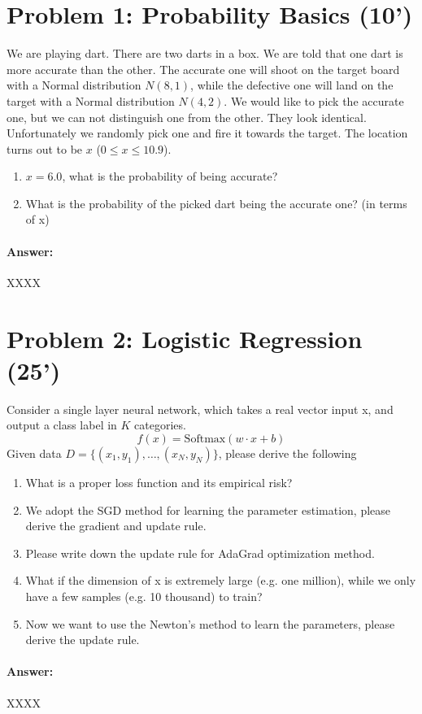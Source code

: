 \documentclass[12pt,letterpaper]{article}
\begin{document}
\section*{Problem 1: Probability Basics (10')} 

We are playing dart. There are two darts in a box. We are told that one dart is more accurate than the other. 
The accurate one will shoot on the target board with a Normal distribution $N(8, 1)$, while the defective one will land on the target with a Normal distribution $N(4, 2)$.
We would like to pick the accurate one, but we can not distinguish one from the other. They look identical. 
Unfortunately we randomly pick one and fire it towards the target. The location turns out to be $x$ ($0 \leq x \leq 10.9$).


\begin{enumerate}
  \item $x=6.0$, what is the probability of being accurate?

  \item What is the probability of the picked dart being the accurate one? (in terms of x)

\end{enumerate}


\paragraph{Answer:}

XXXX


\section*{Problem 2: Logistic Regression (25')} 
Consider a single layer neural network, which takes a real vector input x, and output a class label in $K$ categories. 
\[f(x) = \mathrm{Softmax}(w\cdot x + b)
    \]
Given data $D=\{(x_1,y_1), \dots, (x_N, y_N)\}$, please derive the following
\begin{enumerate}
    \item What is a proper loss function and its empirical risk?
    \item We adopt the SGD method for learning the parameter estimation, please derive the gradient and update rule.
    \item Please write down the update rule for AdaGrad optimization method.
    \item What if the dimension of x is extremely large (e.g. one million), while we only have a few samples (e.g. 10 thousand) to train?
    \item Now we want to use the Newton's method to learn the parameters, please derive the update rule.
\end{enumerate}    


\paragraph{Answer:}

XXXX
\end{document}
